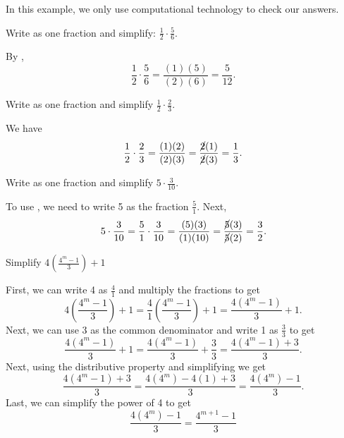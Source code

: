 \begin{exam}
\label{exam_multiplying_fractions}
In this example, we only use computational technology to check our answers.
    \begin{apart}
        \item Write as one fraction and simplify: $\displaystyle \frac{1}{2} \cdot \frac{5}{6}.$
            \begin{soln}
                By ,
                $$\frac{1}{2} \cdot \frac{5}{6}
                = \frac{(1)(5)}{(2)(6)}
                = \frac{5}{12}.
                $$
            \end{soln}
        \item Write as one fraction and simplify $\displaystyle \frac{1}{2} \cdot \frac{2}{3}$.
            \begin{soln}
                We have $$\frac{1}{2} \cdot \frac{2}{3} = \frac{(1)(2)}{(2)(3)}= \frac{\cancel{2}(1)}{\cancel{2}(3)}=\frac{1}{3}.$$
            \end{soln}
        \item Write as one fraction and simplify $\displaystyle 5 \cdot \frac{3}{10}$.
            \begin{soln}
                To use , we need to write 5 as the fraction $\frac{5}{1}$.  Next,
                $$5 \cdot \frac{3}{10}
                = \frac{5}{1} \cdot \frac{3}{10}
                = \frac{(5)(3)}{(1)(10)}
                = \frac{\cancel{5}(3)}{\cancel{5}(2)}
                = \frac{3}{2}.
                $$
            \end{soln}
        \item Simplify $\displaystyle 4 \left(\frac{4^m-1}{3}\right)+1$
            \begin{soln}
                First, we can write 4 as $\frac{4}{1}$ and multiply the fractions to get
                $$4 \left(\frac{4^m-1}{3}\right)+1
                = \frac{4}{1} \left(\frac{4^m-1}{3}\right)+1
                = \frac{4\left(4^m-1\right)}{3}+1
                .$$
                Next, we can use 3 as the common denominator and write 1 as $\frac{3}{3}$ to get
                $$\frac{4\left(4^m-1\right)}{3}+1
                = \frac{4\left(4^m-1\right)}{3}+\frac{3}{3}
                = \frac{4\left(4^m-1\right)+3}{3}
                .$$
                Next, using the distributive property and simplifying we get
                $$\frac{4\left(4^m-1\right)+3}{3}
                = \frac{4\left(4^m\right)-4(1)+3}{3}
                =\frac{4\left(4^m\right)-1}{3}       
                .$$  
                Last, we can simplify the power of 4 to get
                $$\frac{4\left(4^m\right)-1}{3} 
                = \frac{4^{m+1}-1}{3}$$
            \end{soln}
    \end{apart}
\end{exam}

